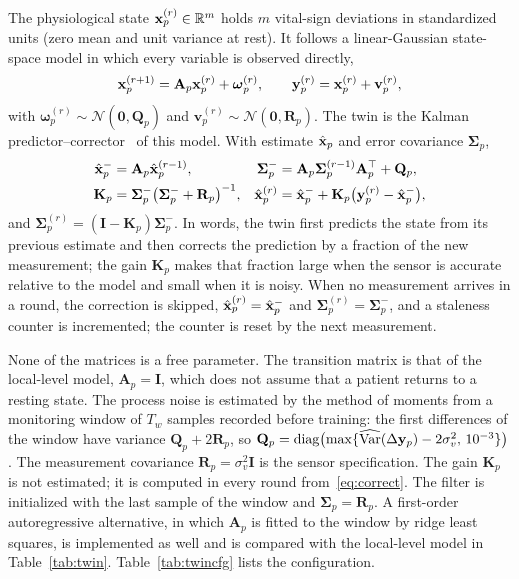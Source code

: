 \begin{revblock}The physiological state $\mathbf{x}_p^{(r)}\in\mathbb{R}^m$ holds $m$ vital-sign deviations in standardized units (zero mean and unit variance at rest). It follows a linear-Gaussian state-space model in which every variable is observed directly,
\begin{equation}
	\mathbf{x}_p^{(r+1)}=\mathbf{A}_p\mathbf{x}_p^{(r)}+\boldsymbol{\omega}_p^{(r)},\qquad \mathbf{y}_p^{(r)}=\mathbf{x}_p^{(r)}+\mathbf{v}_p^{(r)},
	\label{eq:twinmodel}
\end{equation}
with $\boldsymbol{\omega}_p^{(r)}\sim\mathcal{N}(\mathbf{0},\mathbf{Q}_p)$ and $\mathbf{v}_p^{(r)}\sim\mathcal{N}(\mathbf{0},\mathbf{R}_p)$. The twin is the Kalman predictor--corrector~\cite{kalman1960new} of this model. With estimate $\hat{\mathbf{x}}_p$ and error covariance $\boldsymbol{\Sigma}_p$,
\begin{align}
	\hat{\mathbf{x}}_p^{-}&=\mathbf{A}_p\hat{\mathbf{x}}_p^{(r-1)}, & \boldsymbol{\Sigma}_p^{-}&=\mathbf{A}_p\boldsymbol{\Sigma}_p^{(r-1)}\mathbf{A}_p^{\top}+\mathbf{Q}_p, \label{eq:predict}\\
	\mathbf{K}_p&=\boldsymbol{\Sigma}_p^{-}\bigl(\boldsymbol{\Sigma}_p^{-}+\mathbf{R}_p\bigr)^{-1}, & \hat{\mathbf{x}}_p^{(r)}&=\hat{\mathbf{x}}_p^{-}+\mathbf{K}_p\bigl(\mathbf{y}_p^{(r)}-\hat{\mathbf{x}}_p^{-}\bigr), \label{eq:correct}
\end{align}
and $\boldsymbol{\Sigma}_p^{(r)}=(\mathbf{I}-\mathbf{K}_p)\boldsymbol{\Sigma}_p^{-}$. In words, the twin first predicts the state from its previous estimate and then corrects the prediction by a fraction of the new measurement; the gain $\mathbf{K}_p$ makes that fraction large when the sensor is accurate relative to the model and small when it is noisy. When no measurement arrives in a round, the correction is skipped, $\hat{\mathbf{x}}_p^{(r)}=\hat{\mathbf{x}}_p^{-}$ and $\boldsymbol{\Sigma}_p^{(r)}=\boldsymbol{\Sigma}_p^{-}$, and a staleness counter is incremented; the counter is reset by the next measurement.

None of the matrices is a free parameter. The transition matrix is that of the local-level model, $\mathbf{A}_p=\mathbf{I}$, which does not assume that a patient returns to a resting state. The process noise is estimated by the method of moments from a monitoring window of $T_w$ samples recorded before training: the first differences of the window have variance $\mathbf{Q}_p+2\mathbf{R}_p$, so $\mathbf{Q}_p=\operatorname{diag}\bigl(\max\{\widehat{\operatorname{Var}}(\Delta\mathbf{y}_p)-2\sigma_v^2,\,10^{-3}\}\bigr)$. The measurement covariance $\mathbf{R}_p=\sigma_v^2\mathbf{I}$ is the sensor specification. The gain $\mathbf{K}_p$ is not estimated; it is computed in every round from~\eqref{eq:correct}. The filter is initialized with the last sample of the window and $\boldsymbol{\Sigma}_p=\mathbf{R}_p$. A first-order autoregressive alternative, in which $\mathbf{A}_p$ is fitted to the window by ridge least squares, is implemented as well and is compared with the local-level model in Table~\ref{tab:twin}. Table~\ref{tab:twincfg} lists the configuration.\end{revblock}

